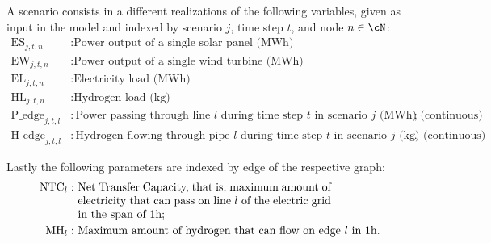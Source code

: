 \documentclass[english]{article}
\numberwithin{definition}{section}
\numberwithin{theorem}{section}
\numberwithin{problem}{section}
\begin{document}
A scenario consists in a different realizations of the following variables, given as input in the model and  indexed by scenario \(j\), time step \(t\), and node \(n \in \cN\):
\begin{align*}
    \text{ES}_{j,t,n} & : \text{Power output of a single solar panel (MWh)}\\
    \text{EW}_{j,t,n} & : \text{Power output of a single wind turbine (MWh)}\\
    \text{EL}_{j,t,n} & : \text{Electricity load (MWh)}\\
    \text{HL}_{j,t,n} & : \text{Hydrogen load (kg)} \\
    \text{P\_edge}_{j,t,l} & : \text{Power passing through line $l$ during time step $t$ in scenario $j$ (MWh) (continuous)};\\
    \text{H\_edge}_{j,t,l} & : \text{Hydrogen flowing through pipe $l$ during time step $t$ in scenario $j$ (kg) (continuous)}.
\end{align*}

Lastly the following parameters are indexed by edge of the respective graph:
\begin{align*}
    \text{NTC}_l : & \ \parbox[t]{0.65\textwidth}{Net Transfer Capacity, that is, maximum amount of electricity that can pass on line \text{$l$} of the electric grid in the span of 1h;}\\
    \text{MH}_l : & \text{ Maximum amount of hydrogen that can flow on edge $l$ in 1h}.
\end{align*}
\end{document}
